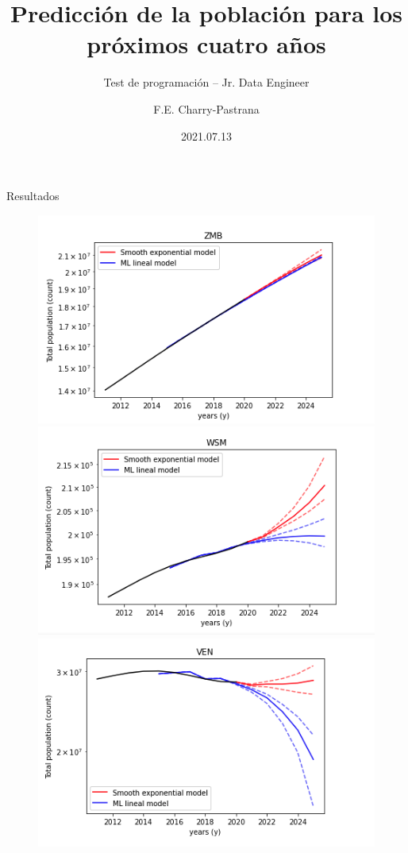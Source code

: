 \documentclass[10pt]{beamer}
\title{Predicción de la población para los próximos cuatro años}
\subtitle{Test de programación – Jr. Data Engineer}
\author{F.E. Charry-Pastrana}
\date{2021.07.13}
\begin{document}
\begin{frame}
\titlepage
\end{frame}


\begin{frame}{Resultados}
\begin{figure}
\includegraphics[scale=0.3]{img/1.png}
\includegraphics[scale=0.3]{img/2.png}
\includegraphics[scale=0.3]{img/3.png}

\end{figure}
\end{frame}
\end{document}
